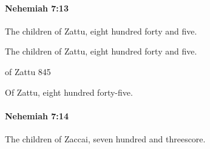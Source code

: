 		\paragraph{Nehemiah 7:13} %
			\label{NEHEMIAH-7-13}

			The children of Zattu, eight hundred forty and five.

			\begin{versebox}
					\item[BHS] 
					\item[LXX] 
					\item[ASV] The children of Zattu, eight hundred forty and five.
					\item[NIV] of Zattu 845
					\item[NRSV] Of Zattu, eight hundred forty-five.
			\end{versebox}

		\paragraph{Nehemiah 7:14} %
			\label{NEHEMIAH-7-14}

			The children of Zaccai, seven hundred and threescore.

